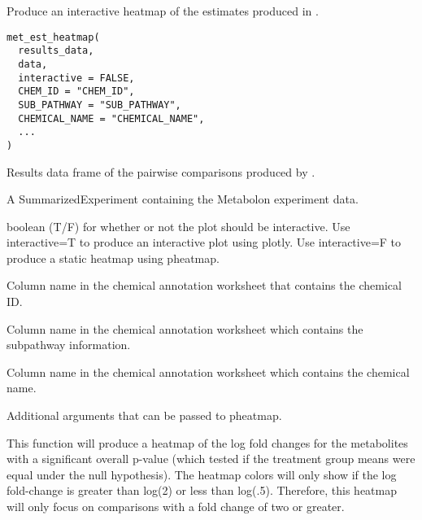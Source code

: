 \documentclass[a4paper]{book}
\begin{document}
%
\begin{Description}
Produce an interactive heatmap of the estimates produced in
.
\end{Description}
%
\begin{Usage}
\begin{verbatim}
met_est_heatmap(
  results_data,
  data,
  interactive = FALSE,
  CHEM_ID = "CHEM_ID",
  SUB_PATHWAY = "SUB_PATHWAY",
  CHEMICAL_NAME = "CHEMICAL_NAME",
  ...
)
\end{verbatim}
\end{Usage}
%
\begin{Arguments}
\begin{ldescription}
\item[\code{results\_data}] Results data frame of the pairwise comparisons produced
by .

\item[\code{data}] A SummarizedExperiment containing the Metabolon experiment data.

\item[\code{interactive}] boolean (T/F) for whether or not the plot should be
interactive. Use interactive=T to produce an interactive plot using
plotly. Use interactive=F to produce a static heatmap using pheatmap.

\item[\code{CHEM\_ID}] Column name in the chemical annotation worksheet that contains
the chemical ID.

\item[\code{SUB\_PATHWAY}] Column name in the chemical annotation worksheet which
contains the subpathway information.

\item[\code{CHEMICAL\_NAME}] Column name in the chemical annotation worksheet which
contains the chemical name.

\item[\code{...}] Additional arguments that can be passed to pheatmap.
\end{ldescription}
\end{Arguments}
%
\begin{Details}
This function will produce a heatmap of the log fold changes for the
metabolites with a significant overall p-value (which tested if the treatment
group means were equal under the null hypothesis). The heatmap colors will
only show if the log fold-change is greater than log(2) or less than
log(.5). Therefore, this heatmap will only focus on comparisons with a
fold change of two or greater.
\end{Details}
\end{document}
